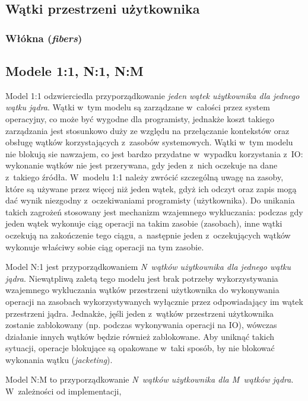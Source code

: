 \subsection{Wątki przestrzeni użytkownika}

\subsubsection{Włókna (\emph{fibers})}

\subsection{Modele 1:1, {\bf N}:1, {\bf N}:{\bf M}}

%
\indent
	Model 1:1 odzwierciedla przyporządkowanie \emph{jeden wątek użytkownika dla jednego wątku jądra}.
	Wątki w~tym modelu są zarządzane w~całości przez system operacyjny, co może być wygodne dla programisty,
	jednakże koszt takiego zarządzania jest stosunkowo duży ze względu na przełączanie kontekstów oraz obsługę
	wątków korzystających z~zasobów systemowych. Wątki w~tym modelu nie blokują sie nawzajem, co jest bardzo przydatne
	w~wypadku korzystania z~IO: wykonanie wątków nie jest przerywana, gdy jeden z~nich oczekuje na dane z~takiego źródła.
	W~modelu 1:1 należy zwrócić szczególną uwagę na zasoby, które
	są używane przez więcej niż jeden wątek, gdyż ich odczyt oraz zapis mogą dać wynik niezgodny z~oczekiwaniami
	programisty (użytkownika). Do unikania takich zagrożeń stosowany jest mechanizm wzajemnego wykluczania: podczas gdy jeden
	wątek wykonuje ciąg operacji na takim zasobie (zasobach), inne wątki oczekują na zakończenie tego ciągu, a~następnie 
	jeden z~oczekujących wątków wykonuje właściwy sobie ciąg operacji na tym zasobie.
\par
%
\indent
	Model N:1 jest przyporządkowaniem \emph{N~wątków użytkownika dla jednego wątku jądra}. Niewątpliwą zaletą tego modelu
	jest brak potrzeby wykorzystywania wzajemnego wykluczania wątków przestrzeni użytkownika do wykonywania operacji
	na zasobach wykorzystywanych wyłącznie przez odpowiadający im wątek przestrzeni jądra. Jednakże, jęśli jeden z~wątków przestrzeni
	użytkownika zostanie zablokowany (np. podczas wykonywania operacji na IO), wówczas działanie innych wątków będzie również zablokowane.
	Aby uniknąć takich sytuacji, operacje blokujące są opakowane w~taki sposób, by nie blokować wykonania wątku (\emph{jacketing}).
\par
%
\indent
	Model N:M to przyporządkowanie \emph{N~wątków użytkownika dla M~wątków jądra}. W~zależności od implementacji,  
\par

